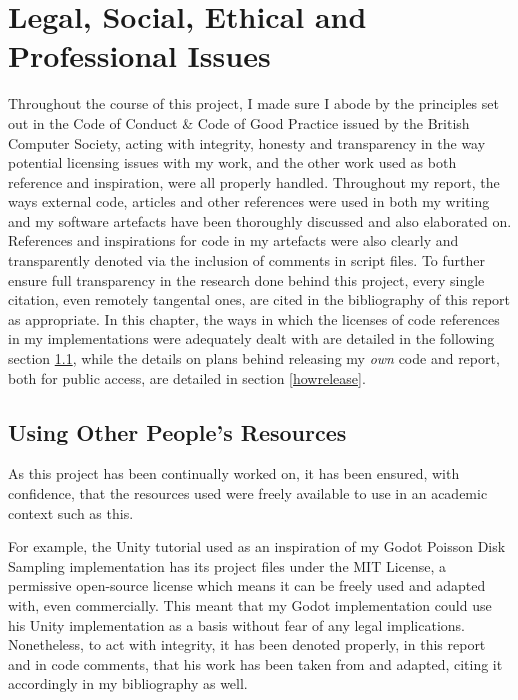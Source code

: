 \chapter{Legal, Social, Ethical and Professional Issues} \label{Issues}

Throughout the course of this project, I made sure I abode by the principles set out in the Code of Conduct \& Code of Good Practice issued by the British Computer Society\cite{bcscodeofconduct}, acting with integrity, honesty and transparency in the way potential licensing issues with my work, and the other work used as both reference and inspiration, were all properly handled. Throughout my report, the ways external code, articles and other references were used in both my writing and my software artefacts have been thoroughly discussed and also elaborated on. References and inspirations for code in my artefacts were also clearly and transparently denoted via the inclusion of comments in script files. To further ensure full transparency in the research done behind this project, every single citation, even remotely tangental ones, are cited in the bibliography of this report as appropriate. In this chapter, the ways in which the licenses of code references in my implementations were adequately dealt with are detailed in the following section \ref{howuse}, while the details on plans behind releasing my \textit{own} code and report, both for public access, are detailed in section \ref{howrelease}.  

\section{Using Other People's Resources} \label{howuse}

As this project has been continually worked on, it has been ensured, with confidence, that the resources used were freely available to use in an academic context such as this.

For example, the Unity tutorial used as an inspiration of my Godot Poisson Disk Sampling implementation\cite{seblaguetuteYT} has its project files under the MIT License\cite{seblaguetuteGH}, a permissive open-source license which means it can be freely used and adapted with, even commercially.\cite{mitlicense} This meant that my Godot implementation could use his Unity implementation as a basis without fear of any legal implications. Nonetheless, to act with integrity, it has been denoted properly, in this report and in code comments, that his work has been taken from and adapted, citing it accordingly in my bibliography as well.

